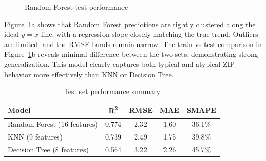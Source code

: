 \begin{figure}[!ht]
    \centering
    \hfill
    \caption{Random Forest test performance}
    \caption*{\hspace{1em}}
    \label{fig:rf_results}
\end{figure}
\FloatBarrier

Figure~\ref{fig:rf_results}a shows that Random Forest predictions are tightly clustered along the ideal $y=x$ line, with a regression slope closely matching the true trend. Outliers are limited, and the RMSE bands remain narrow. The train vs test comparison in Figure~\ref{fig:rf_results}b reveals minimal difference between the two sets, demonstrating strong generalization. This model clearly captures both typical and atypical ZIP behavior more effectively than KNN or Decision Tree.

\begin{table}[!ht]
    \centering
    \caption{Test set performance summary}
    \label{tab:model_results}
    \begin{tabular}{lcccc}
        \toprule
        \textbf{Model} & \textbf{R\textsuperscript{2}} & \textbf{RMSE} & \textbf{MAE} & \textbf{SMAPE} \\
        \midrule
        Random Forest (16 features) & 0.774 & 2.32 & 1.60 & 36.1\% \\
        KNN (9 features)            & 0.739 & 2.49 & 1.75 & 39.8\% \\
        Decision Tree (8 features)  & 0.564 & 3.22 & 2.26 & 45.7\% \\
        \bottomrule
    \end{tabular}
\end{table}
\FloatBarrier

